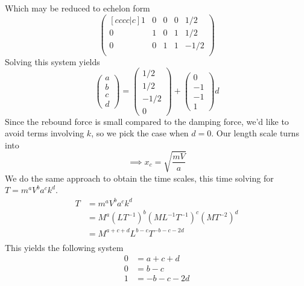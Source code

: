 \documentclass[12pt]{article}
\begin{document}
Which may be reduced to echelon form
\begin{equation*}
  \begin{pmatrix}[cccc|c]
    1 & 0 & 0 & 0 & 1/2 \\
    0 & 1 & 0 & 1 & 1/2 \\
    0 & 0 & 1 & 1 & -1/2 \\
  \end{pmatrix}
\end{equation*}
Solving this system yields
\begin{equation*}
  \begin{pmatrix}
    a \\ b \\ c \\ d
  \end{pmatrix} =
  \begin{pmatrix}
    1/2 \\ 1/2 \\ -1/2 \\ 0
  \end{pmatrix} +
  \begin{pmatrix}
    0 \\ -1 \\ -1 \\ 1
  \end{pmatrix}
  d
\end{equation*}
Since the rebound force is small compared to the damping force, we'd like to
avoid terms involving $k$, so we pick the case when $d=0$. Our length scale
turns into
\begin{equation}
  \label{eq:4-length-scale}
  \implies x_c = \sqrt{\frac{mV}{a}}
\end{equation}
We do the same approach to obtain the time scales, this time solving for
$T=m^aV^ba^ck^d$.
\begin{equation*}
  \begin{aligned}
    T &= m^aV^ba^ck^d \\
    &= M^{a}(LT^{-1})^b(ML^{-1}T^{-1})^c(MT^{-2})^d \\
    &= M^{a+c+d}L^{b-c}T^{-b-c-2d} \\
  \end{aligned}
\end{equation*}
This yields the following system
\begin{equation*}
  \begin{aligned}
    0 &= a + c + d \\
    0 &= b - c \\
    1 &= -b  - c - 2d \\
  \end{aligned}
\end{equation*}
\end{document}
